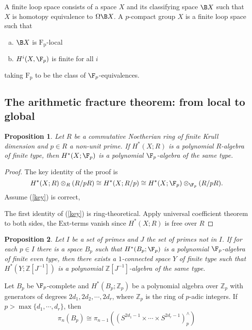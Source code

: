 \documentclass[psamsfonts]{amsart}
\newtheorem{prop}{Proposition}[section]
\theoremstyle{definition}
\newcommand{\Z}{\mathbb{Z}}
\numberwithin{equation}{section}
\begin{document}
A finite loop space consists of a space $X$ and its classifying space $\B X$ such that $X$ is homotopy equivalence to $\Omega\B X$. A $p$-compact group $X$ is a finite loop space such that\begin{enumerate}[(a)]
    \item $\B X$ is $\mathrm{F_p}$-local
    \item $H^i(X,\F_p)$ is finite for all $i$
\end{enumerate}
taking $\mathrm{F_p}$ to be the class of $\F_p$-equivalences.

\subsection{The arithmetic fracture theorem: from local to global}

\begin{prop}
Let $R$ be a commutative Noetherian ring of finite Krull dimension and $p\in R$ a non-unit prime. If $H^\ast(X;R)$ is a polynomial $R$-algebra of finite type, then $H^\ast(X;\F_p)$ is a polynomial $\F_p$-algebra of the same type.
\end{prop}
\begin{proof}
The key identity of the proof is
\begin{equation}\label{key} H^\ast(X;R)\otimes_R (R/pR)\cong H^\ast(X;R/p)\cong H^\ast(X;\F_p)\otimes_{\F_p}(R/pR).
\end{equation}
Assume (\ref{key}) is correct, \medbreak

The first identity of (\ref{key}) is ring-theoretical. Apply universal coefficient theorem to both sides, the $\mathrm{Ext}$-terms vanish since $H^\ast(X;R)$ is free over $R$
\end{proof}


\begin{prop}
Let $I$ be a set of primes and $J$ the set of primes not in $I$. If for each $p\in I$ there is a space $B_p$ such that $H^\ast(B_p;\F_p)$ is a polynomial $\F_p$-algebra of finite even type, then there exists a $1$-connected space $Y$ of finite type such that $H^\ast(Y;\Z[J^{-1}])$ is a polynomial $\Z[J^{-1}]$-algebra of the same type.
\end{prop}

Let $B_p$ be $\F_p$-complete and $H^\ast(B_p;\Z_p)$ be a polynomial algebra over $\Z_p$ with generators of degrees $2d_1,2d_2,\cdots,2d_r$, where $\Z_p$ is the ring of $p$-adic integers. If $p>\max\{d_1,\cdots,d_r\}$, then
\[\pi_n(B_p)\cong\pi_{n-1}\left((S^{2d_1-1}\times\cdots\times S^{2d_r-1})_p^\wedge\right)\]\medbreak
\end{document}
